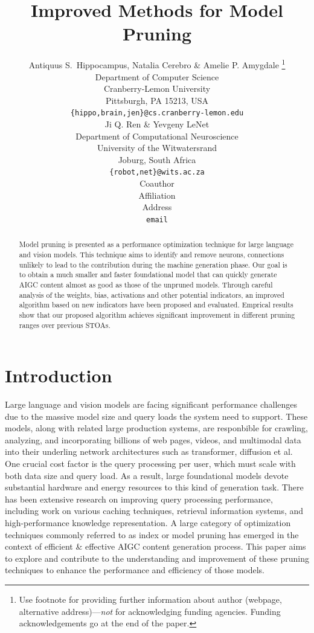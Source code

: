 \documentclass{article} %
\title{Improved Methods for Model Pruning}
\author{Antiquus S.~Hippocampus, Natalia Cerebro \& Amelie P. Amygdale \thanks{ Use footnote for providing further information
about author (webpage, alternative address)---\emph{not} for acknowledging
funding agencies.  Funding acknowledgements go at the end of the paper.} \\
Department of Computer Science\\
Cranberry-Lemon University\\
Pittsburgh, PA 15213, USA \\
\texttt{\{hippo,brain,jen\}@cs.cranberry-lemon.edu} \\
\And
Ji Q. Ren \& Yevgeny LeNet \\
Department of Computational Neuroscience \\
University of the Witwatersrand \\
Joburg, South Africa \\
\texttt{\{robot,net\}@wits.ac.za} \\
\AND
Coauthor \\
Affiliation \\
Address \\
\texttt{email}
}
\begin{document}
\maketitle

\begin{abstract}
Model pruning is presented as a performance optimization technique for large language and vision models. This technique aims to identify and remove neurons, connections unlikely to lead to the contribution during the machine generation phase. Our goal is to obtain a much smaller and faster foundational model that can quickly generate AIGC content almost as good as those of the unpruned models. Through careful analysis of the weights, bias, activations and other potential indicators, an improved algorithm based on new indicators have been proposed and evaluated. Emprical results show that our proposed algorithm achieves significant improvement in different pruning ranges over previous STOAs.
\end{abstract}

\section{Introduction}
\label{intro}
Large language and vision models are facing significant performance challenges due to the massive model size and query loads the system need to support. These models, along with related large production systems, are responbible for crawling, analyzing, and incorporating billions of web pages, videos, and multimodal data into their underling network architectures such as transformer, diffusion et al.
One crucial cost factor is the query processing per user, which must scale with both data size and query load. As a result, large foundational models devote substantial hardware and energy resources to this kind of generation task. There has been extensive research on improving query processing performance, including work on various caching techniques, retrieval information systems, and high-performance knowledge representation.
A large category of optimization techniques commonly referred to as index or model pruning has emerged in the context of efficient \& effective AIGC content generation process. This paper aims to explore and contribute to the understanding and improvement of these pruning techniques to enhance the performance and efficiency of those models.
\end{document}
